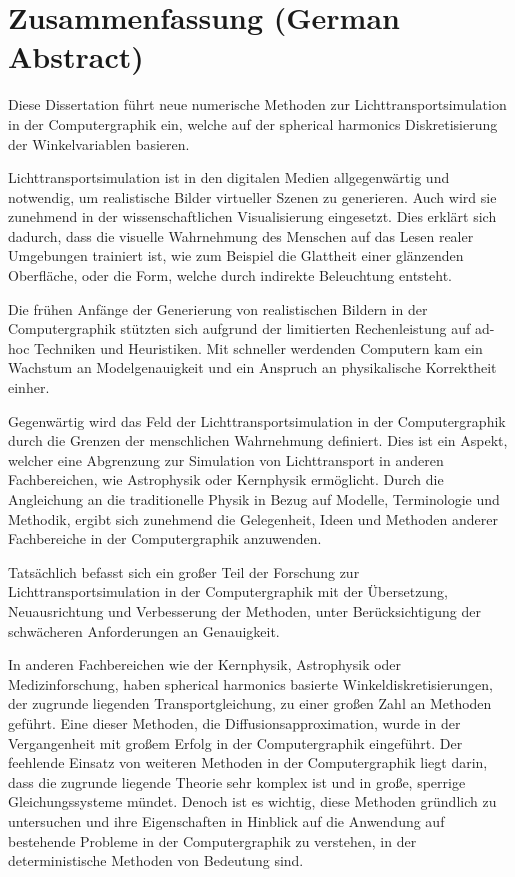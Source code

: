 %
\chapter*{Zusammenfassung (German Abstract)}
%
%
Diese Dissertation führt neue numerische Methoden zur Lichttransportsimulation in der Computergraphik ein, welche auf der spherical harmonics Diskretisierung der Winkelvariablen basieren.

Lichttransportsimulation ist in den digitalen Medien allgegenwärtig und notwendig, um realistische Bilder virtueller Szenen zu generieren. Auch wird sie zunehmend in der wissenschaftlichen Visualisierung eingesetzt. Dies erklärt sich dadurch, dass die visuelle Wahrnehmung des Menschen auf das Lesen realer Umgebungen trainiert ist, wie zum Beispiel die Glattheit einer glänzenden Oberfläche, oder die Form, welche durch indirekte Beleuchtung entsteht.

Die frühen Anfänge der Generierung von realistischen Bildern in der Computergraphik stützten sich aufgrund der limitierten Rechenleistung auf ad-hoc Techniken und Heuristiken. Mit schneller werdenden Computern kam ein Wachstum an Modelgenauigkeit und ein Anspruch an physikalische Korrektheit einher.

Gegenwärtig wird das Feld der Lichttransportsimulation in der Computergraphik durch die Grenzen der menschlichen Wahrnehmung definiert. Dies ist ein Aspekt, welcher eine Abgrenzung zur Simulation von Lichttransport in anderen Fachbereichen, wie Astrophysik oder Kernphysik ermöglicht. Durch die Angleichung an die traditionelle Physik in Bezug auf Modelle, Terminologie und Methodik, ergibt sich zunehmend die Gelegenheit, Ideen und Methoden anderer Fachbereiche in der Computergraphik anzuwenden.

Tatsächlich befasst sich ein großer Teil der Forschung zur Lichttransportsimulation in der Computergraphik mit der Übersetzung, Neuausrichtung und Verbesserung der Methoden, unter Berücksichtigung der schwächeren Anforderungen an Genauigkeit.

In anderen Fachbereichen wie der Kernphysik, Astrophysik oder Medizinforschung, haben spherical harmonics basierte Winkeldiskretisierungen, der zugrunde liegenden Transportgleichung, zu einer großen Zahl an Methoden geführt. Eine dieser Methoden, die Diffusionsapproximation, wurde in der Vergangenheit mit großem Erfolg in der Computergraphik eingeführt. Der feehlende Einsatz von weiteren Methoden in der Computergraphik liegt darin, dass die zugrunde liegende Theorie sehr komplex ist und in große, sperrige Gleichungssysteme mündet. Denoch ist es wichtig, diese Methoden gründlich zu untersuchen und ihre Eigenschaften in Hinblick auf die Anwendung auf bestehende Probleme in der Computergraphik zu verstehen, in der deterministische Methoden von Bedeutung sind.

